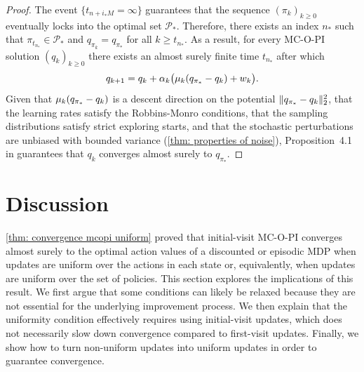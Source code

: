 \begin{proof}
The event $\{t_{n+i_* M} = \infty\}$ guarantees that the sequence $(\pi_k)_{k \ge 0}$ eventually locks into the optimal set $\mathcal P_*$.
Therefore, there exists an index $n_*$ 
such that $\pi_{t_{n_*}} \in \mathcal P_*$ and $q_{\pi_k} = q_{\pi_*}$ for all $k \ge t_{n_*}$.
As a result, for every MC-O-PI solution $(q_k)_{k \ge 0}$ there exists an almost surely finite time $t_{n_*}$ after which
\begin{align}
    q_{k+1}
    =
    q_k + \alpha_k \big( \mu_k( q_{\pi_*} - q_k ) + w_k \big) .
\end{align}
Given that $\mu_k( q_{\pi_*} - q_k )$ is a descent direction on the potential $\|q_{\pi_*} - q_k\|_2^2$, 
that the learning rates satisfy the Robbins-Monro conditions,
that the sampling distributions satisfy strict exploring starts,
and that the stochastic perturbations are unbiased with bounded variance (\autoref{thm: properties of noise}),
Proposition~4.1 in \citep{Bertsekas1996Neuro-DynamicProgramming} guarantees that $q_k$ converges almost surely to $q_{\pi_*}$.
\end{proof}



% 





\section{Discussion}

\autoref{thm: convergence mcopi uniform} proved that initial-visit MC-O-PI converges almost surely to the optimal action values of a discounted or episodic MDP
when updates are uniform over the actions in each state
or, equivalently, when updates are uniform over the set of policies.
% 
This section explores the implications of this result.
We first argue that some conditions can likely be relaxed because they are not essential for the underlying improvement process.
We then explain that the uniformity condition effectively requires using initial-visit updates, which does not necessarily slow down convergence compared to first-visit updates.
Finally, we show how to turn non-uniform updates into uniform updates in order to guarantee convergence.


